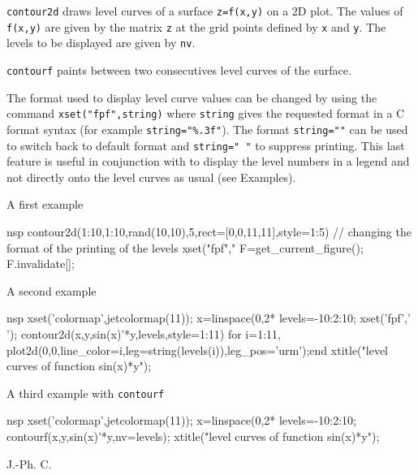 \begin{mandescription}
  \verb!contour2d! draws level curves of a surface
  \verb!z=f(x,y)! on a 2D plot. The values of \verb!f(x,y)! are
  given by the matrix \verb!z! at the grid points defined by
  \verb!x! and \verb!y!. The levels to be displayed are given by \verb!nv!.

  \verb!contourf! paints between two consecutives level curves of the surface.

  The format used to display level curve values can be changed by
  using the command \verb!xset("fpf",string)! where \verb!string!
  gives the requested format in a C format syntax (for example
  \verb!string="%.3f"!). The format \verb!string=""! can be used
  to switch back to default format and \verb!string=" "! to suppress printing. This
  last feature is useful in conjunction with  to display
  the level numbers in a legend and not directly onto the level curves as
  usual (see Examples).
\end{mandescription}

\begin{examples}

\noindent A first example

\begin{mintednsp}{nsp}
  contour2d(1:10,1:10,rand(10,10),5,rect=[0,0,11,11],style=1:5)
  // changing the format of the printing of the levels
  xset("fpf","%
  F=get_current_figure();
  F.invalidate[];
\end{mintednsp}

\noindent A second example

\begin{mintednsp}{nsp}
  xset('colormap',jetcolormap(11));
  x=linspace(0,2*%
  levels=-10:2:10;
  xset('fpf',' ');
  contour2d(x,y,sin(x)'*y,levels,style=1:11)
  for i=1:11, plot2d(0,0,line_color=i,leg=string(levels(i)),leg_pos='urm');end
  xtitle("level curves of function sin(x)*y");
\end{mintednsp}

\noindent A third example with \verb!contourf!

\begin{mintednsp}{nsp}
  xset('colormap',jetcolormap(11));
  x=linspace(0,2*%
  levels=-10:2:10;
  contourf(x,y,sin(x)'*y,nv=levels);
  xtitle("level curves of function sin(x)*y");
\end{mintednsp}

\end{examples}
\begin{manseealso}
    
\end{manseealso}
\begin{authors}
  J.-Ph. C.
\end{authors}
